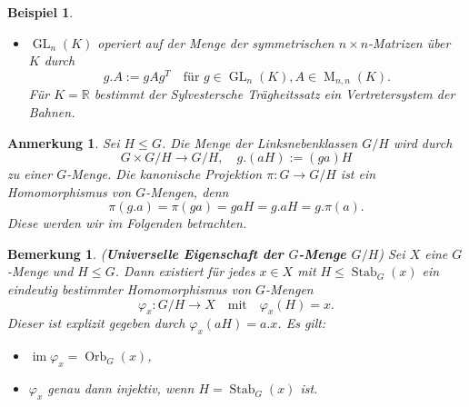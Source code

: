 \documentclass[a4paper, twoside, 11pt, ngerman]{report}
\DeclareMathOperator{\GL}{GL}
\DeclareMathOperator{\image}{im}
\DeclareMathOperator{\Mat}{M}
\DeclareMathOperator{\Orb}{Orb}
\DeclareMathOperator{\Stab}{Stab}
\theoremstyle{definistyle}
\newtheorem{bem}[satz]{Bemerkung}
\newtheorem{anm}[satz]{Anmerkung}
\newtheorem{bsp}[satz]{Beispiel}
\theoremstyle{remark}
\newcommand{\defn}[1]{\textit{\bfseries #1}}
\begin{document}
\begin{bsp}
\begin{enumerate}[label=(\alph*)]
\begin{itemize}
    \item $\GL_n(K)$ operiert auf der Menge der symmetrischen $n \times n$-Matrizen über $K$ durch 
    \[g . A := g A g^T \quad \text{für } g\in\GL_n(K), A\in\Mat_{n,n}(K).\]
    Für $K = \mathbb{R}$ bestimmt der Sylvestersche Trägheitssatz ein Vertretersystem der Bahnen.
    \end{itemize}    
\end{enumerate}
\end{bsp}

\begin{anm}\label{anm:linksnebenkl_op}
Sei $H \leq G$. Die Menge der Linksnebenklassen $G / H$ wird durch 
\[
G \times G / H \to G / H, \quad g . (a H) := (g a) H
\]
zu einer $G$-Menge. Die kanonische Projektion $\pi \colon G \to G / H$ ist ein Homomorphismus von $G$-Mengen, denn
\[
\pi(g . a) = \pi(g a) = g a H = g.aH = g . \pi(a).
\]
Diese werden wir im Folgenden betrachten.
\end{anm}

\begin{bem}\label{bem:univ_eig_g_menge}
(\defn{Universelle Eigenschaft der $G$-Menge $G / H$}) Sei $X$ eine $G$-Menge und $H \leq G$. Dann existiert für jedes $x \in X$ mit $H \leq \Stab_G(x)$ ein eindeutig bestimmter Homomorphismus von $G$-Mengen
\[
\varphi_x \colon G / H \to X \quad \text{mit} \quad \varphi_x(H) = x.
\]
Dieser ist explizit gegeben durch $\varphi_x(a H) = a . x$. Es gilt: 
\begin{itemize}
\item $\image \varphi_x = \Orb_G(x)$,
\item $\varphi_x$ genau dann injektiv, wenn $H = \Stab_G(x)$ ist.
\end{itemize}
\end{bem}
\end{document}
